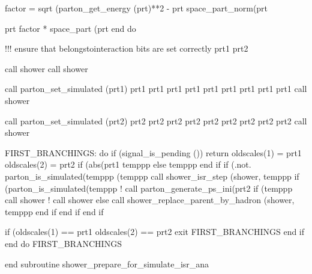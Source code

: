        factor = sqrt (parton_get_energy (prt)**2 - prt%
            space_part_norm(prt%

       prt%
            factor * space_part (prt%
    end do

    !!! ensure that belongstointeraction bits are set correctly
    prt1%
    prt2%

    call shower%
    call shower%

    call parton_set_simulated (prt1)
    prt1%
    prt1%
    prt1%
    prt1%
    prt1%
    prt1%
    prt1%
    prt1%
    prt1%
    call shower%

    call parton_set_simulated (prt2)
    prt2%
    prt2%
    prt2%
    prt2%
    prt2%
    prt2%
    prt2%
    prt2%
    prt2%
    call shower%

    FIRST_BRANCHINGS: do
       if (signal_is_pending ()) return
       oldscales(1) = prt1%
       oldscales(2) = prt2%
       if (abs(prt1%
          temppp%
       else
          temppp%
       end if
       if (.not. parton_is_simulated(temppp%
            (temppp%
          call shower_isr_step (shower, temppp%
          if (parton_is_simulated(temppp%
             ! call parton_generate_ps_ini(prt2%
             if (temppp%
                call shower%
                ! call shower%
             else
                call shower_replace_parent_by_hadron (shower, temppp%
             end if
          end if
       end if

       if (oldscales(1) == prt1%
           oldscales(2) == prt2%
          exit FIRST_BRANCHINGS
       end if
    end do FIRST_BRANCHINGS

  end subroutine shower_prepare_for_simulate_isr_ana

